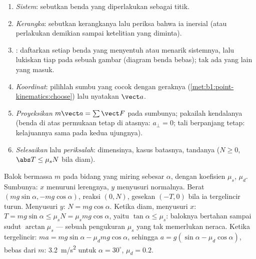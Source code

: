 \begin{method}\label{met:b1:newton-dynamics:method}
\begin{enumerate}
  \item \emph{Sistem}: sebutkan benda yang diperlakukan sebagai titik.
  \item \emph{Kerangka}: sebutkan kerangkanya lalu periksa bahwa ia
        inersial (atau perlakukan demikian sampai ketelitian yang
        diminta).
  \item \emph{}: daftarkan setiap benda yang menyentuh atau menarik
        sistemnya, lalu lukiskan tiap  pada sebuah gambar
        (diagram benda bebas); tak ada yang lain yang masuk.
  \item \emph{Koordinat}: pilihlah sumbu yang cocok dengan geraknya
        (\cref{met:b1:point-kinematics:choose}) lalu nyatakan $\vect a$.
  \item \emph{Proyeksikan} $m\vect a = \sum\vect F$ pada sumbunya;
        pakailah kendalanya (benda di atas permukaan tetap di atasnya:
        $a_\perp = 0$; tali berpanjang tetap: kelajuannya sama pada
        kedua ujungnya).
  \item \emph{Selesaikan} lalu \emph{periksalah}: dimensinya, kasus
        batasnya, tandanya ($N \geq 0$, $\abs T \leq \mu_sN$ bila diam).
\end{enumerate}
\end{method}

\begin{example}\label{ex:b1:newton-dynamics:incline}
Balok bermassa $m$ pada bidang yang miring sebesar $\alpha$, dengan
koefisien $\mu_s$, $\mu_d$. Sumbunya: $x$ menuruni lerengnya, $y$
menyusuri normalnya. Berat $(mg\sin\alpha, -mg\cos\alpha)$, reaksi
$(0, N)$, gesekan $(-T, 0)$ bila ia tergelincir turun. Menyusuri $y$:
$N = mg\cos\alpha$. Ketika diam, menyusuri $x$:
$T = mg\sin\alpha \leq \mu_sN = \mu_smg\cos\alpha$, yaitu $\tan\alpha
\leq \mu_s$: baloknya bertahan sampai sudut $\arctan\mu_s$ --- sebuah
pengukuran $\mu_s$ yang tak memerlukan neraca. Ketika tergelincir:
$ma = mg\sin\alpha -
\mu_dmg\cos\alpha$, sehingga $a = g(\sin\alpha - \mu_d\cos\alpha)$, bebas
dari $m$: \qty{3.2}{m/s^2} untuk $\alpha = 30^\circ$, $\mu_d = 0.2$.
\end{example}

